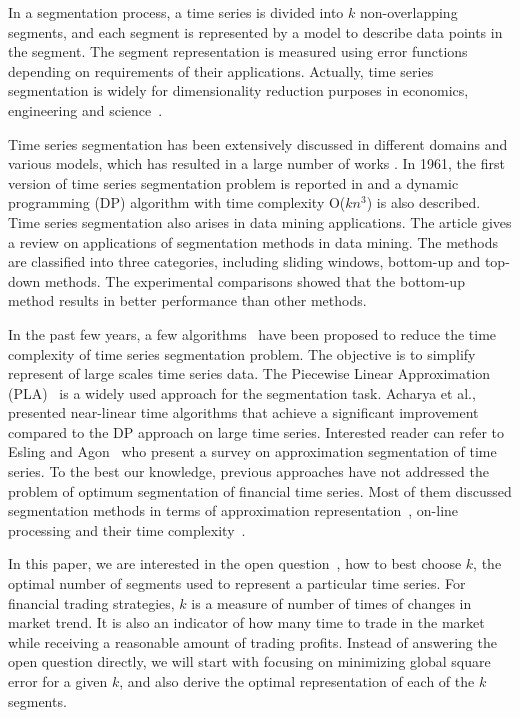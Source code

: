 \documentclass{article}
\begin{document}
In a segmentation process, a time series is divided into $k$ non-overlapping segments, and each segment is represented by a model to describe data points in the segment. The segment representation is measured using error functions depending on requirements of their applications. Actually, time series segmentation is widely for dimensionality reduction purposes in economics, engineering and science~\cite{Bingham2006}.




Time series segmentation has been extensively discussed in different domains and various models, which has resulted in a large number of works \cite{lin2007experiencing,Esling2012}. In 1961, the first version of time series segmentation problem is reported in \cite{Bellman61} and a dynamic programming (DP) algorithm with time complexity O($kn^3$) is also described. Time series segmentation also arises in data mining applications. The article \cite{Keogh2004} gives a review on applications of segmentation methods in data mining. The methods are classified into three categories, including sliding windows, bottom-up and top-down methods. The experimental comparisons showed that the bottom-up method results in better performance than other methods.



In the past few years, a few algorithms~\cite{Shatkay1996,RosmanNIPS2014,AcharyaICML2016,TerziSDM2006} have been proposed to reduce the time complexity of time series segmentation problem. The objective is to simplify represent of large scales time series data. The Piecewise Linear Approximation (PLA)~\cite{Shatkay1996} is a widely used approach for the segmentation task. Acharya et al.,~\cite{AcharyaICML2016} presented near-linear time algorithms that achieve a significant improvement compared to the DP approach on large time series. Interested reader can refer to Esling and Agon~\cite{Esling2012} who present a survey on approximation segmentation of time series. To the best our knowledge, previous approaches have not addressed the problem of optimum segmentation of financial time series. Most of them discussed segmentation methods in terms of approximation representation~\cite{Shatkay1996}, on-line processing \cite{RosmanNIPS2014} and their time complexity~\cite{AcharyaICML2016}.


In this paper, we are interested in the open question~\cite{Keogh1998}, how to best choose $k$, the optimal number of segments used to represent a particular time series. For financial trading strategies, $k$ is a measure of number of times of changes in market trend. It is also an indicator of how many time to trade in the market while receiving a reasonable amount of trading profits. Instead of answering the open question directly, we will start with focusing on minimizing global square error for a given $k$, and also derive the optimal representation of each of the $k$ segments.
\end{document}
